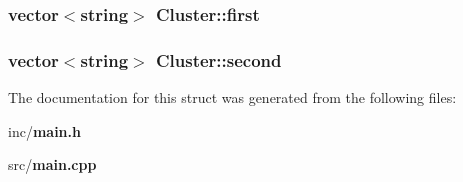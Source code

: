 \subsubsection{\setlength{\rightskip}{0pt plus 5cm}vector$<$string$>$ {\bf Cluster::first}}\label{structCluster_6faa4a8072fabb9df52bc5882ad83d28}


\subsubsection{\setlength{\rightskip}{0pt plus 5cm}vector$<$string$>$ {\bf Cluster::second}}\label{structCluster_defe091a0a3e6834c3b858f9eb23d2c2}




The documentation for this struct was generated from the following files:\begin{CompactItemize}
\item 
inc/{\bf main.h}\item 
src/{\bf main.cpp}\end{CompactItemize}
